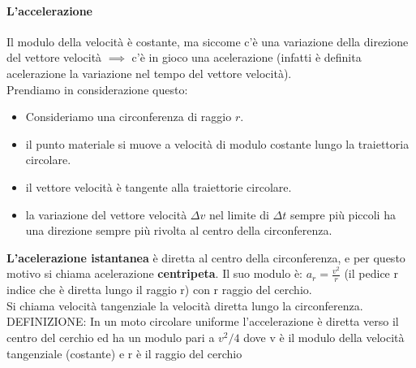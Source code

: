 \documentclass[12pt, a4paper, openany]{book}
\begin{document}
\paragraph*{L'accelerazione }Il modulo della velocità è costante, ma siccome c'è una variazione della direzione del vettore velocità $\implies$ c'è in gioco una acelerazione
(infatti è definita acelerazione la variazione nel tempo del vettore velocità).
\\Prendiamo in considerazione questo:
\begin{itemize}
    \item Consideriamo una circonferenza di raggio $r$.
    \item il punto materiale si muove a velocità di modulo costante lungo la traiettoria circolare.
    \item il vettore velocità è tangente alla traiettorie circolare.
    \item la variazione del vettore velocità $\Delta v$ nel limite di $\Delta t$ sempre più piccoli ha una direzione sempre più rivolta al centro della circonferenza.
\end{itemize}
\textbf{L'acelerazione istantanea} è diretta al centro della circonferenza, e per questo motivo si chiama acelerazione \textbf{centripeta}.
Il suo modulo è: $a_r = \frac{v^2}{r}$ (il pedice r indice che è diretta lungo il raggio r) con r raggio del cerchio.
\\Si chiama velocità tangenziale la velocità diretta lungo la circonferenza.
\\DEFINIZIONE: In un moto circolare uniforme l'accelerazione è diretta verso il centro del cerchio ed ha un modulo pari a $v^2/4$ dove v è il modulo della velocità tangenziale (costante) e r è il raggio del cerchio
\end{document}
